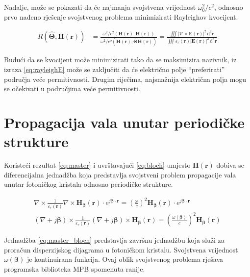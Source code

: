\documentclass[utf8, seminar, numeric]{fer}
\begin{document}
Nadalje, može se pokazati da će najmanja svojstvena vrijednost $\omega_0^2/c^2$,
odnosno prvo nađeno rješenje svojstvenog problema minimizirati Rayleighov
kvocijent.

\begin{align}
	R \left( \hat{\mathbf{\Theta}}, \mathbf{H}(\mathbf{r}) \right)
	&= \frac{
		\omega^2/c^2
		\left(
			\mathbf{H}(\mathbf{r}), \mathbf{H}(\mathbf{r})
		\right)
	}
	{
		\omega^2/c^2
		\left(
			\mathbf{H}(\mathbf{r}), \hat{\mathbf{\Theta}}\mathbf{H}(\mathbf{r})
		\right)
	}
	= \frac{
		\iiint |\nabla \times \mathbf{E}(\mathbf{r})|^2
		\, \mathrm{d}^3\mathbf{r}}
	{\iiint \varepsilon_r(\mathbf{r}) | \mathbf{E}( \mathbf{r} ) |^2
	\, \mathrm{d}^3\mathbf{r}} \label{eq:rayleighE}
\end{align}

Budući da se kvocijent može minimizirati tako da se maksimizira nazivnik, iz
izraza \ref{eq:rayleighE} može se zaključiti da će električno polje
``preferirati'' područja veće permitivnosti. Drugim riječima, najsnažnija
električna polja mogu se očekivati u područjima veće permitivnosti.


\section{Propagacija vala unutar periodičke strukture}

Koristeći rezultat \ref{eq:master} i uvrštavajući \ref{eq:bloch} umjesto
$\mathbf{H}(\mathbf{r})$ dobiva se diferencijalna jednadžba koja predstavlja
svojstveni problem propagacije vala unutar fotoničkog kristala odnosno
periodičke strukture.

\begin{align} \label{eq:master_bloch}
	\nabla \times
	\frac{1}{\varepsilon_r(\mathbf{r})} \nabla \times
	\mathbf{H}_{\bm{\beta}}(\mathbf{r}) \cdot
	e^{j {\bm{\beta}} \cdot \mathbf{r}}
	= \left(
		\frac{\omega}{c}
	\right)^2
	\mathbf{H}_{\bm{\beta}}(\mathbf{r}) \cdot
		e^{j {\bm{\beta}} \cdot \mathbf{r}}	\nonumber \\
	(\nabla + j{\bm{\beta}}) \times
	\frac{1}{\varepsilon_r(\mathbf{r})}
	(\nabla + j{\bm{\beta}}) \times
	\mathbf{H}_{\bm{\beta}}(\mathbf{r})
	= \left(
	\frac{\omega ({\bm{\beta}})}{c}
	\right)^2
	\mathbf{H}_{\bm{\beta}}(\mathbf{r})
\end{align}

Jednadžba \ref{eq:master_bloch} predstavlja završnu jednadžbu koja služi za
proračun disperzijskog dijagrama u fotoničkom kristalu. Svojstvena vrijednost
${\omega ({\bm{\beta}})}$ je kontinuirana funkcija. Ovaj oblik svojstvenog
problema rješava programska biblioteka MPB spomenuta ranije.
\end{document}
